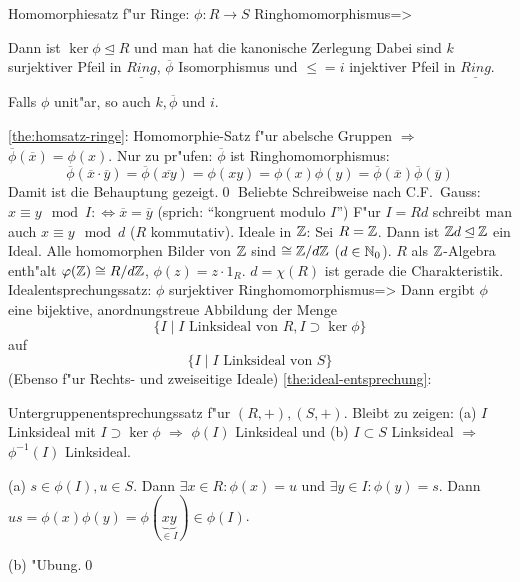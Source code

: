 \theorem Homomorphiesatz f"ur Ringe:
  $\phi:R\to S$ Ringhomomorphismus=>{
  \label{the:homsatz-ringe}
  Dann ist $\ker \phi\unlhd R$ und man hat die kanonische Zerlegung
  Dabei sind $k$ surjektiver Pfeil in $\underline{Ring}$, $\overline\phi$
  Isomorphismus und $\leq=i$ injektiver Pfeil in $\underline{Ring}$.
  
  Falls $\phi$ unit"ar, so auch $k,\overline \phi$ und $i$.
  }
\proof \ref{the:homsatz-ringe}:{
  Homomorphie-Satz f"ur abelsche Gruppen $\Rightarrow$ $\overline\phi(\overline x)=\phi(x)$.
  Nur zu pr"ufen: $\overline \phi$ ist Ringhomomorphismus: 
  \[\overline\phi(\overline x\cdot \overline y)=\overline\phi(\overline{xy})
    =\phi(xy)=\phi(x)\phi(y)=\overline\phi(\overline x)\overline\phi(\overline y)
    \]
  Damit ist die Behauptung gezeigt.\qed
  }
\remark Beliebte Schreibweise nach C.F.~Gauss:{
  $x\equiv y\mod I:\iff \overline x=\overline y$ (sprich: ``kongruent modulo $I$'')
  F"ur $I=Rd$ schreibt man auch $x\equiv y\mod d$ ($R$ kommutativ).
  }
\example Ideale in $\mathbb Z$:{
  Sei $R=\mathbb Z$. Dann ist $\mathbb Z d\unlhd \mathbb Z$ ein Ideal.
  Alle homomorphen Bilder von $\mathbb Z$ sind $\cong \mathbb Z/ d\mathbb Z$ ($d\in\mathbb N_0$).
  $R$ als $\mathbb Z$-Algebra enth"alt $\varphi(\mathbb Z)\cong R/d\mathbb Z$, $\phi(z)=z\cdot 1_R$.
  $d=\chi(R)$ ist gerade die Charakteristik.
  }
\theorem Idealentsprechungssatz:
  $\phi$ surjektiver Ringhomomorphismus=>{
  \label{the:ideal-entsprechung}
  Dann ergibt $\phi$ eine bijektive, anordnungstreue Abbildung der
  Menge 
  \[\{I\mid I\text{ Linksideal von $R$},I\supset\ker\phi\}
    \]
  auf
  \[\{I\mid I\text{ Linksideal von $S$}\}
    \] 
  (Ebenso f"ur Rechts- und zweiseitige Ideale)
  }
\proof \ref{the:ideal-entsprechung}:{
  Untergruppenentsprechungssatz f"ur $(R,+),(S,+)$.
  Bleibt zu zeigen: (a) $I$ Linksideal mit $I\supset\ker \phi$ $\Rightarrow$ $\phi(I)$ Linksideal und 
  (b) $I\subset S$ Linksideal $\Rightarrow$ $\phi^{-1}(I)$ Linksideal.
  
  (a) $s\in \phi(I),u\in S$. Dann $\exists x\in R:\phi(x)=u$ und $\exists y\in I:\phi(y)=s$.
  Dann $us=\phi(x)\phi(y)=\phi(\underbrace{xy}_{\in I})\in \phi(I)$.
  
  (b) "Ubung.\qed
  }
